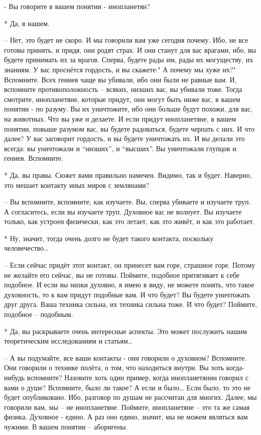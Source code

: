  - Вы говорите в вашем понятии - инопланетян?

 * Да, в нашем.

 – Нет, это будет не скоро. И мы говорили вам уже сегодня почему. Ибо, не все готовы принять, и придя, они родят страх. И они станут для вас врагами, ибо, вы будете принимать их за врагов. Сперва, будете рады им, рады их могуществу, их знаниям. У вас проснётся гордость, и вы скажете:" А почему мы хуже их?" Вспомните. Всех гениев чаще вы убивали, ибо они были не равные вам. И, вспомните противоположность – всяких, низших вас, вы убивали тоже. Тогда смотрите, инопланетяне, которые придут, они могут быть ниже вас, в вашем понятии - по разуму. Вы их уничтожите, ибо они больше будут похожи, для вас, на животных. Что вы уже и делаете. И если придут инопланетяне, в вашем понятии, повыше разумом вас, вы будете радоваться, будете черпать с них. И что далее? У вас заговорит гордость, и вы будете уничтожать их. И вы делали это всегда: вы уничтожали и “низших”, и “высших”. Вы уничтожали глупцов и гениев. Вспомните.

 * Да, вы правы. Сюжет вами правильно намечен. Видимо, так и будет. Наверно, это мешает контакту иных миров с землянами?

 – Вы вспомните, вспомните, как изучаете. Вы, сперва убиваете и изучаете труп. А согласитесь, если вы изучаете труп. Духовное вас не волнует. Вы изучаете только, как устроен физически, как это летает, как это живёт, и как это работает.

 * Ну, значит, тогда очень долго не будет такого контакта, поскольку человечество…

 – Если сейчас придёт этот контакт, он принесет вам горе, страшное горе. Потому не желайте его сейчас, вы не готовы. Поймите, подобное притягивает к себе подобное. И если вы низки духовно, я имею в виду, не можете понять, что такое духовность, то к вам придут подобные вам. И что будет? Вы будете уничтожать друг друга. Ваша техника сильна, их техника сильна тоже. И что будет? Поймите, подобное – подобным.

 * Да, вы раскрываете очень интересные аспекты. Это может послужить нашим теоретическим исследованиям и статьям…

 – А вы подумайте, все ваши контакты - они говорили о духовном? Вспомните. Они говорили о технике полёта, о том, что находиться внутри. Вы хоть когда-нибудь вспомните? Назовите хоть один пример, когда инопланетянин говорил с вами о душе? Вспомните, было ли такое? А если и было… Если было, то это не будет опубликовано. Ибо, разговор по душам не рассчитан для многих. Далее, мы говорили вам, мы – не инопланетяне. Поймите, инопланетяне – это та же самая физика. Духовное - едино. А раз оно едино, значит, мы не можем являться вам чужими. В вашем понятии – аборигены.

